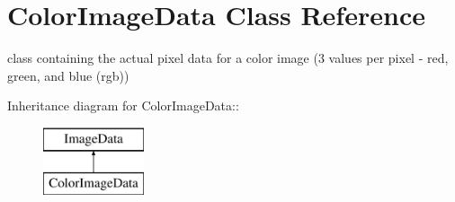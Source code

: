 \section{Color\-Image\-Data Class Reference}
\label{class_c_s_image_viewer_1_1_color_image_data}
class containing the actual pixel data for a color image (3 values per pixel - red, green, and blue (rgb))  


Inheritance diagram for Color\-Image\-Data::\begin{figure}[H]
\begin{center}
\leavevmode
\includegraphics[height=2cm]{class_c_s_image_viewer_1_1_color_image_data}
\end{center}
\end{figure}
